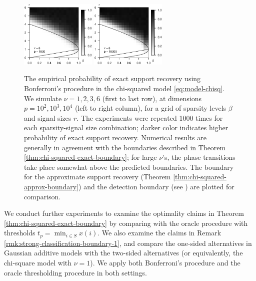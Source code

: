 \begin{figure}
      \includegraphics[width=0.32\textwidth]{./sim_strong_boundary/simulated_phase_diagram_chi-squared_nu6_p1000.eps}
      \includegraphics[width=0.32\textwidth]{./sim_strong_boundary/simulated_phase_diagram_chi-squared_nu6_p10000.eps}
      \caption{The empirical probability of exact support recovery using Bonferroni's procedure in the chi-squared model \eqref{eq:model-chisq}. 
      We simulate $\nu=1, 2, 3, 6$ (first to last row), at dimensions $p=10^2, 10^3, 10^4$ (left to right column), for a grid of sparsity levels $\beta$ and signal sizes $r$.
      The experiments were repeated 1000 times for each sparsity-signal size combination; darker color indicates higher probability of exact support recovery.  
      Numerical results are generally in agreement with the boundaries described in Theorem \ref{thm:chi-squared-exact-boundary}; for large $\nu$'s, the phase transitions take place somewhat above the predicted boundaries.
      The boundary for the approximate support recovery (Theorem \ref{thm:chi-squared-approx-boundary}) and the detection boundary (see \citep{donoho2004higher}) are plotted for comparison.} 
      \label{fig:phase-simulated-chi-squared}
\end{figure}

We conduct further experiments to examine the optimality claims in Theorem \ref{thm:chi-squared-exact-boundary} by comparing with the oracle procedure with thresholds $t_p=\min_{i\in S}x(i)$.
We also examine the claims in Remark \ref{rmk:strong-classification-boundary-1}, and compare the one-sided alternatives in Gaussian additive models with the two-sided alternatives (or equivalently, the chi-square model with $\nu=1$).
We apply both Bonferroni's procedure and the oracle thresholding procedure in both settings.

